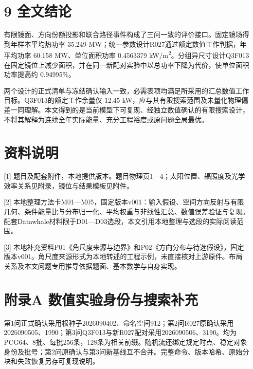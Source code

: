 \documentclass[UTF8,fontset=windows,zihao=-4]{ctexart}
\begin{document}
\section*{9 全文结论}

有限镜面、方向份额投影和联合路径事件构成了三问一致的评价接口。固定镜场得到年样本平均热功率 35.249 MW；统一参数设计R027通过额定数值工作判据，年平均功率 60.158 MW、单位面积功率 0.4563379 kW/m\textsuperscript{2}。分组异尺寸设计Q3F013在固定镜位上减少面积，并在同一新配对实验中以总功率下降为代价，使单位面积功率提高约 0.94995\%。

两个设计的正式清单与冻结确认输入一致，必需表项均满足所采用的汇总数值工作目标。Q3F013的额定工作余量仅 12.45 kW，应与其有限搜索范围及未量化物理偏差一同理解。本文得到的是当前模型下可复现、经独立数值确认的有限搜索设计，不将其解释为连续全年实际能量、充分工程裕度或原问题全局最优。

\section*{资料说明}

[1] 题目及配套附件，本地提供版本。题目物理页1—4；太阳位置、辐照度及光学效率关系见附录，镜位与结果模板见附件。

[2] 本地整理方法卡M01—M05，固定版本v001：输入假设、空间方向反射与有限几何、条件能量比与分布归一化、平均权重与非线性汇总、数值误差验证与复现。配套Datawhale材料限于D01—D03选段，本文引用本地整理与选段的实际阅读范围。

[3] 本地补充资料P01《角尺度来源与边界》和P02《方向分布与待选假设》，固定版本v001。角尺度来源形式为本地转述的工程示例，未直接核对上游原件。布局关系及本文问题专用推导依据题面、基本数学与自身实现。

\section*{附录A 数值实验身份与搜索补充}

第1问正式确认采用根种子2026090402、命名空间912；第2问R027原确认采用2026090505、1990；第3问Q3F013与新R027配对采用2026090506、3190。均为PCG64、8批、每批256条，128条为相关前缀。随机流还绑定规定时点、稳定对象身份及批号；第2问原确认与第3问新基线互不合并。完整命令、版本哈希、原始分块和失败恢复另存可复现说明。
\end{document}
